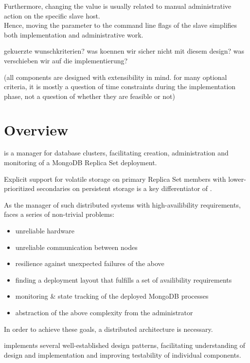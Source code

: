 Furthermore, changing the value is usually related to manual administrative action on the specific slave host.\\
Hence, moving the parameter to the command line flags of the slave simplifies both implementation and administrative work.


gekuerzte wunschkriterien? was koennen wir sicher nicht mit diesem design? was verschieben wir auf die implementierung?

(all components are designed with extensibility in mind. for many optional criteria, it is mostly a question of time constraints during the implementation phase, not a question of whether they are feasible or not)

\section{Overview}

\mamid is a manager for database clusters, facilitating creation, administration and monitoring of a MongoDB Replica Set deployment.

Explicit support for volatile storage on primary Replica Set members with lower-prioritized secondaries on persistent
storage is a key differentiator of \mamid.

As the manager of such distributed systems with high-availibility requirements, \mamid faces a series of non-trivial problems:
\begin{itemize}
  \item unreliable hardware
  \item unreliable communication between nodes
  \item resilience against unexpected failures of the above 
  \item finding a deployment layout that fulfills a set of availibility requirements
  \item monitoring \& state tracking of the deployed MongoDB processes
  \item abstraction of the above complexity from the administrator
\end{itemize}

In order to achieve these goals, a distributed architecture is necessary.

\mamid implements several well-established design patterns, facilitating understanding of design and implementation and improving
testability of individual components.

